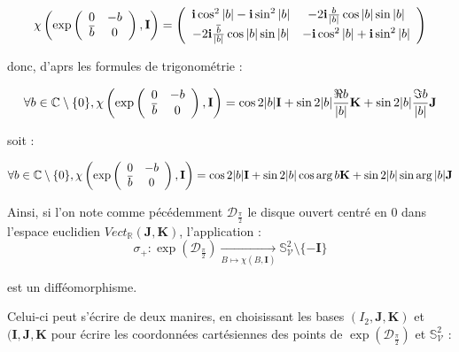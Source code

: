 \begin{equation}
\chi\left(\exp\mcd{0}{-b}{\overline{b}}{0},\mathbf{I}\right)=%
\mcd%
{\mathbf{i}\cos^2 |b|-\mathbf{i}\sin^2|b|}%
{-2\mathbf{i}\frac{b}{|b|}\cos |b|\sin |b|}%
{-2\mathbf{i}\frac{\overline{b}}{|b|}\cos |b|\sin |b|}%
{-\mathbf{i}\cos^2 |b|+\mathbf{i}\sin^2 |b|}
\end{equation}

donc, d'aprs les formules de trigonom\'etrie :

\begin{equation}
\forall b\in\mathbb{C}\setminus\{0\},%
\chi\left(\exp\mcd{0}{-b}{\overline{b}}{0},\mathbf{I}\right)=%
\cos 2|b|\mathbf{I}+\sin2|b|\frac{\Re b}{|b|}\mathbf{K}+\sin2|b|\frac{\Im b}{|b|}\mathbf{J}
\end{equation}

soit :

\begin{equation}\label{dbcl}
\forall b\in\mathbb{C}\setminus\{0\},%
\chi\left(\exp\mcd{0}{-b}{\overline{b}}{0},\mathbf{I}\right)=%
\cos 2|b|\mathbf{I}+\sin2|b|\cos\arg b\mathbf{K}+\sin2|b|\sin\arg|b|\mathbf{J}
\end{equation}

Ainsi, si l'on note comme p\'ec\'edemment $\mathcal{D}_{\frac{\pi}{2}}$ le disque ouvert centr\'e en $0$ dans l'espace euclidien $Vect_{\mathbb{R}}(\mathbf{J},\mathbf{K})$, %
l'application :
\[%
\sigma_+ :\exp(\mathcal{D}_{\frac{\pi}{2}})\underset{B\mapsto\chi(B,\mathbf{I})}{\longrightarrow}\mathbb{S}_{\mathcal{V}}^2\setminus\{-\mathbf{I}\}%
\]

est un diff\'eomorphisme.

\par
Celui-ci peut s'\'ecrire de deux manires, en choisissant les bases $(I_2,\mathbf{J},\mathbf{K}) $ et $(\mathbf{I},\mathbf{J},\mathbf{K}$ %
pour \'ecrire les coordonn\'ees cart\'esiennes des points de $\exp(\mathcal{D}_{\frac{\pi}{2}})$ et $\mathbb{S}^2_{\mathcal{V}}$ :

